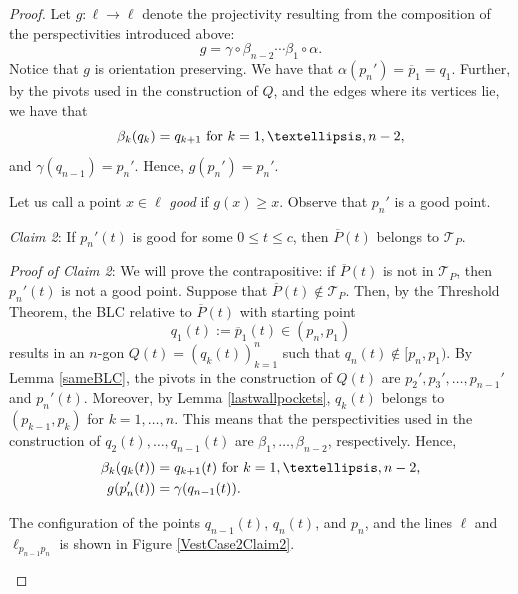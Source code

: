 \documentclass[11pt]{amsart}
\theoremstyle{remark}
\numberwithin{equation}{section}
\newcommand{\TT}{\mathcal{T}}
\renewcommand{\leq}{\leqslant}
\renewcommand{\geq}{\geqslant}
\begin{document}
\begin{proof}
Let $g\colon \ell\to \ell$ denote the projectivity resulting from the  composition of the perspectivities introduced above:
\[
g=\gamma \circ \beta_{n-2}\cdots \beta_1\circ\alpha.
\]
Notice that $g$ is orientation preserving. We have that $\alpha(p_n') =\overline p_1=q_1$. Further, by the pivots used in the construction of $Q$, and the 
edges where its vertices lie, we have that 
\[
\beta_k(q_k) =q_{k+1}\hbox{ for }k=1,\ldots,n-2,
\]
and $\gamma(q_{n-1}) =p_n'$.  Hence,  $g(p_n')=p_n'$.

Let us call a point $x\in \ell$  \emph{good} if $g(x)\geq x$. Observe that $p_n'$ is a good point.  


\emph{Claim 2}: If $p_n'(t)$ is good for some $0\leq  t\leq c$, then $\overline P(t)$ belongs to $\TT_P$.


{\it Proof of Claim 2}: We will prove the contrapositive: if $\overline P(t)$ is not in $\TT_P$,
then $p_n'(t)$ is not a good point. Suppose that $\overline P(t)\notin \TT_P$. Then, by the Threshold Theorem,  the BLC relative to $\overline P(t)$ with starting point 
\[
q_1(t):=\overline p_1(t)\in (p_n,p_1)\]
results in an $n$-gon $Q(t)=(q_k(t))_{k=1}^n$ such that $q_n(t)\notin [p_n,p_1)$. By Lemma \ref{sameBLC}, the pivots in the construction of $Q(t)$ are $p_2',p_3',\ldots,p_{n-1}'$ and $p_n'(t)$. Moreover, by Lemma \ref{lastwallpockets}, $q_k(t)$ belongs to $(p_{k-1},p_k)$ for $k=1,\ldots,n$. This means that the perspectivities used in the construction of $q_2(t),\ldots,q_{n-1}(t)$ are $\beta_1,\ldots,\beta_{n-2}$, respectively. Hence, 
\begin{align*}
\beta_k(q_{k}(t)) &=q_{k+1}(t)\hbox{ for $k=1,\ldots,n-2$,}\\
g(p_n'(t)) &=\gamma(q_{n-1}(t)).
\end{align*}

The configuration of the points $q_{n-1}(t)$, $q_n(t)$, and $p_n$, and the lines $\ell$ and $\ell_{p_{n-1}p_n}$ is shown in Figure \ref{VestCase2Claim2}.  

\begin{figure}[h]
\centering

\end{figure}
\end{proof}
\end{document}
